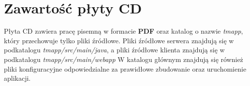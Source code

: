\chapter{Zawartość płyty CD}
\thispagestyle{chapterBeginStyle}
\label{plytaCD}

Płyta CD zawiera pracę pisemną w formacie \textbf{PDF} oraz katalog o nazwie \textit{tmapp}, który przechowuje tylko pliki źródłowe.
Pliki źródłowe serwera znajdują się w podkatalogu \textit{tmapp/src/main/java}, a pliki źródłowe klienta znajdują się w podkatalogu \textit{tmapp/src/main/webapp}
W katalogu głównym znajdują się również pliki konfiguracyjne odpowiedzialne za prawidłowe zbudowanie oraz uruchomienie aplikacji. 
